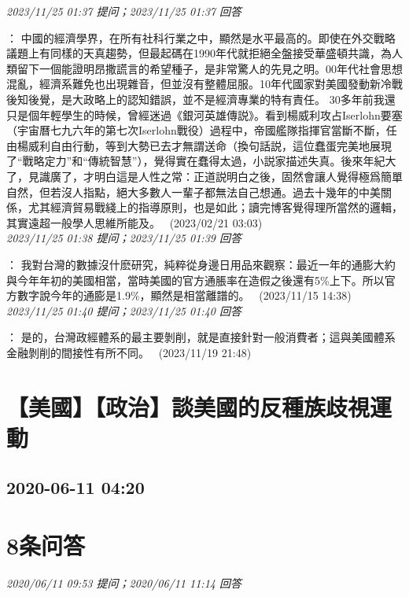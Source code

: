 \documentclass[twocolumn]{ctexart}
\begin{document}
\textit{\hfill\noindent\small 2023/11/25 01:37 提问；2023/11/25 01:37 回答}

：
中國的經濟學界，在所有社科行業之中，顯然是水平最高的。即使在外交戰略議題上有同樣的天真趨勢，但最起碼在1990年代就拒絕全盤接受華盛頓共識，為人類留下一個能證明昂撒謊言的希望種子，是非常驚人的先見之明。00年代社會思想混亂，經濟系難免也出現雜音，但並沒有整體屈服。10年代國家對美國發動新冷戰後知後覺，是大政略上的認知錯誤，並不是經濟專業的特有責任。 
30多年前我還只是個年輕學生的時候，曾經迷過《銀河英雄傳説》。看到楊威利攻占Iserlohn要塞（宇宙曆七九六年的第七次Iserlohn戰役）過程中，帝國艦隊指揮官當斷不斷，任由楊威利自由行動，等到大勢已去才無謂送命（換句話説，這位蠢蛋完美地展現了“戰略定力”和“傳統智慧”），覺得實在蠢得太過，小説家描述失真。後來年紀大了，見識廣了，才明白這是人性之常：正道説明白之後，固然會讓人覺得極爲簡單自然，但若沒人指點，絕大多數人一輩子都無法自己想通。過去十幾年的中美關係，尤其經濟貿易戰綫上的指導原則，也是如此；讀完博客覺得理所當然的邏輯，其實遠超一般學人思維所能及。 
 (2023/02/21 03:03)
\\

\textit{\hfill\noindent\small 2023/11/25 01:38 提问；2023/11/25 01:39 回答}

：
我對台灣的數據沒什麽研究，純粹從身邊日用品來觀察：最近一年的通膨大約與今年年初的美國相當，當時美國的官方通脹率在造假之後還有5\%上下。所以官方數字說今年的通膨是1.9\%，顯然是相當離譜的。 
 (2023/11/15 14:38)
\\

\textit{\hfill\noindent\small 2023/11/25 01:40 提问；2023/11/25 01:40 回答}

：
是的，台灣政經體系的最主要剝削，就是直接針對一般消費者；這與美國體系金融剝削的間接性有所不同。 
 (2023/11/19 21:48)
\\


\section{【美國】【政治】談美國的反種族歧視運動}
\subsection{2020-06-11 04:20}


\section{8条问答}

\textit{\hfill\noindent\small 2020/06/11 09:53 提问；2020/06/11 11:14 回答}
\end{document}
